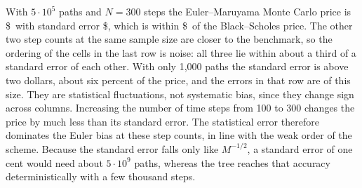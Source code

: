 With $5\cdot10^5$ paths and $N=300$ steps the Euler--Maruyama Monte Carlo price is \$\MCbest\ with standard error \$\MCbestSE, which is within \$\MCbestErr\ of the Black--Scholes price.
The other two step counts at the same sample size are closer to the benchmark, so the ordering of the cells in the last row is noise: all three lie within about a third of a standard error of each other.
With only 1,000 paths the standard error is above two dollars, about six percent of the price, and the errors in that row are of this size.
They are statistical fluctuations, not systematic bias, since they change sign across columns.
Increasing the number of time steps from 100 to 300 changes the price by much less than its standard error.
The statistical error therefore dominates the Euler bias at these step counts, in line with the weak order of the scheme.
Because the standard error falls only like $M^{-1/2}$, a standard error of one cent would need about $5\cdot10^{9}$ paths, whereas the tree reaches that accuracy deterministically with a few thousand steps.
